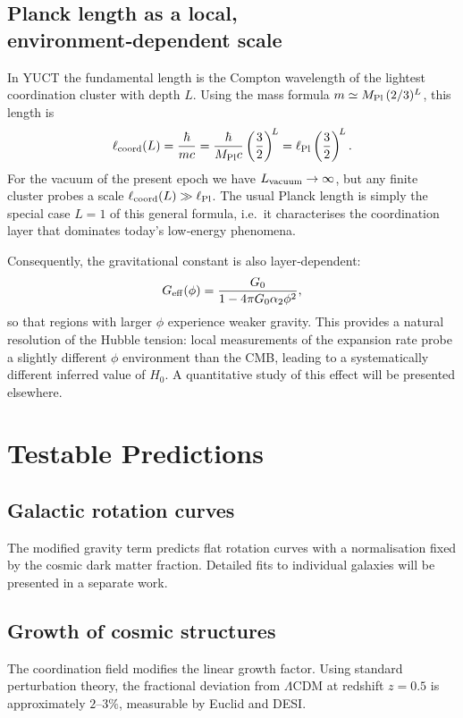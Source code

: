 \documentclass[12pt,a4paper]{article}
\begin{document}
	\subsection{Planck length as a local, environment‑dependent scale}
	
	In YUCT the fundamental length is the Compton wavelength of the lightest coordination
	cluster with depth $L$. Using the mass formula $m \simeq M_{\rm Pl}\,(2/3)^L$, this length is
	\begin{equation}
		\ell_{\rm coord}(L) = \frac{\hbar}{m c}
		= \frac{\hbar}{M_{\rm Pl}c} \left(\frac{3}{2}\right)^{\!L}
		= \ell_{\rm Pl} \left(\frac{3}{2}\right)^{\!L}.
		\label{eq:length-from-L}
	\end{equation}
	For the vacuum of the present epoch we have $L_{\rm vacuum}\to\infty$, but any finite
	cluster probes a scale $\ell_{\rm coord}(L) \gg \ell_{\rm Pl}$. The usual Planck length
	is simply the special case $L=1$ of this general formula, i.e.\ it characterises the
	coordination layer that dominates today's low‑energy phenomena.
	
	Consequently, the gravitational constant is also layer‑dependent:
	\begin{equation}
		G_{\rm eff}(\phi) = \frac{G_0}{1-4\pi G_0\alpha_2\phi^2},
		\label{eq:Geff-layer}
	\end{equation}
	so that regions with larger $\phi$ experience weaker gravity. This provides a natural
	resolution of the Hubble tension: local measurements of the expansion rate probe a
	slightly different $\phi$ environment than the CMB, leading to a systematically
	different inferred value of $H_0$. A quantitative study of this effect will be
	presented elsewhere.
	
	\section{Testable Predictions}
	
	\subsection{Galactic rotation curves}
	The modified gravity term predicts flat rotation curves with a normalisation fixed by the cosmic dark matter fraction. Detailed fits to individual galaxies will be presented in a separate work.
	
	\subsection{Growth of cosmic structures}
	The coordination field modifies the linear growth factor. Using standard perturbation theory, the fractional deviation from \(\Lambda\)CDM at redshift \(z=0.5\) is approximately \(2\)--\(3\%\), measurable by Euclid and DESI.
	
\end{document}
